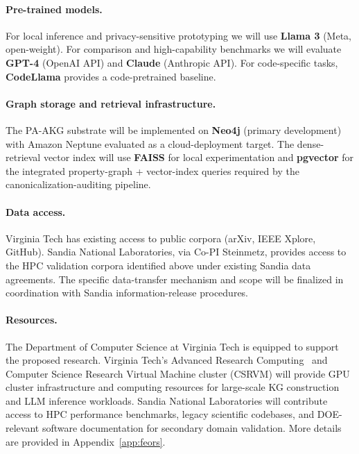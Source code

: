 
\paragraph{Pre-trained models.} For local inference and privacy-sensitive prototyping we will use \textbf{Llama 3} (Meta, open-weight). For comparison and high-capability benchmarks we will evaluate \textbf{GPT-4} (OpenAI API) and \textbf{Claude} (Anthropic API). For code-specific tasks, \textbf{CodeLlama} provides a code-pretrained baseline.

\paragraph{Graph storage and retrieval infrastructure.} The PA-AKG substrate will be implemented on \textbf{Neo4j} (primary development) with Amazon Neptune evaluated as a cloud-deployment target. The dense-retrieval vector index will use \textbf{FAISS} for local experimentation and \textbf{pgvector} for the integrated property-graph + vector-index queries required by the canonicalization-auditing pipeline.

\paragraph{Data access.} Virginia Tech has existing access to public corpora (arXiv, IEEE Xplore, GitHub). Sandia National Laboratories, via Co-PI Steinmetz, provides access to the HPC validation corpora identified above under existing Sandia data agreements. The specific data-transfer mechanism and scope will be finalized in coordination with Sandia information-release procedures.

\paragraph{Resources.} The Department of Computer Science at Virginia Tech is equipped to support the proposed research. Virginia Tech's Advanced Research Computing~\cite{arc} and Computer Science Research Virtual Machine cluster (CSRVM) will provide GPU cluster infrastructure and computing resources for large-scale KG construction and LLM inference workloads. Sandia National Laboratories will contribute access to HPC performance benchmarks, legacy scientific codebases, and DOE-relevant software documentation for secondary domain validation. More details are provided in Appendix~\ref{app:feors}.

